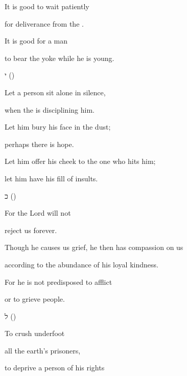 {\par }{\Q {}It is good
to wait patiently
\par }{\Q for deliverance
from the
{}.
\par }{\Q {}It is good
for
a man
\par }{\Q to bear
the yoke
while he is young.
\par }{\SH י ({})
\par }{\Q {}Let a person sit alone in silence,
\par }{\Q when the
{} is disciplining him.
\par }{\Q {}Let
him bury
his face
in the dust;
\par }{\Q perhaps
there is
hope.
\par }{\Q {}Let him offer
his cheek
to the one who hits
him;

\par }{\Q let him have his fill
of insults.
\par }{\SH כ ({})
\par }{\Q {}For the Lord will not
\par }{\Q reject us forever.
\par }{\Q {}Though
he causes
us grief,
he then has compassion
on us

\par }{\Q according to the abundance
of his loyal kindness.
\par }{\Q {}For
he is not
predisposed
to afflict
\par }{\Q or to grieve
people.
\par }{\SH ל ({})
\par }{\Q {}To crush underfoot
\par }{\Q all the earth’s prisoners,
\par }{\Q {}to deprive a person
of his rights

}
